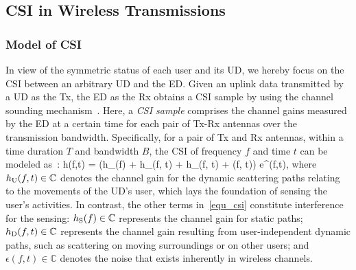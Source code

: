 \subsection{CSI in Wireless Transmissions}\label{s2ec_channel_model}
\subsubsection{Model of CSI}
In view of the symmetric status of each user and its UD, we hereby focus on the CSI between an arbitrary UD and the ED.
Given an uplink data transmitted by a UD as the Tx, the ED as the Rx obtains a CSI sample by using the channel sounding mechanism~\cite{IEEE_standard, 3GPP_TS_138_211}.
Here, a \emph{CSI sample} comprises the channel gains measured by the ED at a certain time for each pair of Tx-Rx antennas over the transmission bandwidth.
Specifically, for a pair of Tx and Rx antennas, within a time duration $T$ and bandwidth $B$, the CSI of frequency $f$ and time $t$ can be modeled as~\cite{goldsmith2005wireless,Chen23ACS_CDWIFI}:
\beq
\label{equ_csi}
h(f,t) = \big(h_{\rstatic}(f) + h_{\rdyna}(f, t) + h_{\rU}(f, t) + \epsilon(f, t)\big) e^{\iu \varphi(f,t)},
\eeq
where $h_{\mathrm{U}}(f, t)\in\mathbb C$ denotes the channel gain for the dynamic scattering paths relating to the movements of the UD's user, which lays the foundation of sensing the user's activities. 
In contrast, the other terms in~\eqref{equ_csi} constitute interference for the sensing:
$h_{\mathrm{S}}(f)\in\mathbb C$ represents the channel gain for static paths;
$h_{\mathrm{D}}(f, t)\in\mathbb C$ represents the channel gain resulting from user-independent dynamic paths, such as scattering on moving surroundings or on other users;
and $\epsilon(f,t)\in\mathbb C$ denotes the noise that exists inherently in wireless channels.

